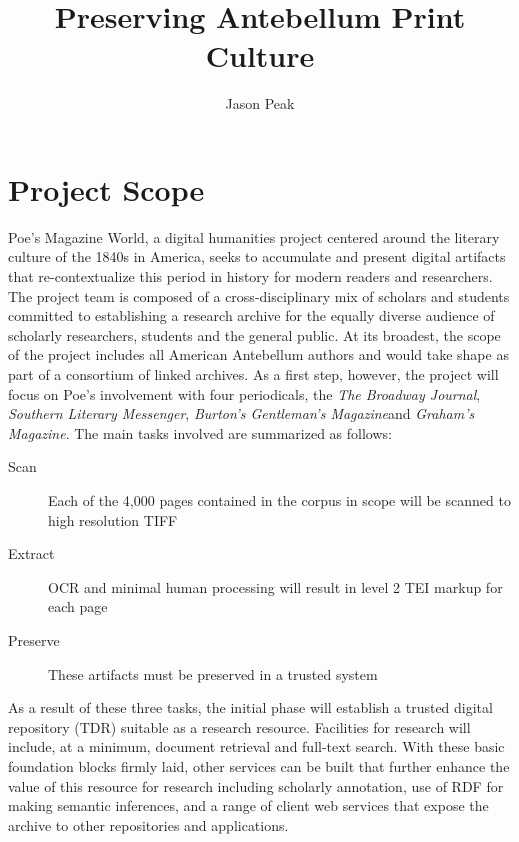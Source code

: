 \documentclass{article}
\begin{document}
\title{Preserving Antebellum Print Culture}
\author{Jason Peak}
\maketitle


\def\projectname{Poe's Magazine World}
\def\APC{Antebellum Print Culture}
\def\bwj{\emph{The Broadway Journal}}
\def\slm{\emph{Southern Literary Messenger}}
\def\bgm{\emph{Burton's Gentleman's Magazine}}
\def\gm{\emph{Graham's Magazine}}

\section{Project Scope}
\projectname, a digital humanities project centered around the literary culture of the 1840s in America, seeks to accumulate and present digital artifacts that re-contextualize this period in history for modern readers and researchers. The project team is composed of a cross-disciplinary mix of scholars and students committed to establishing a research archive for the equally diverse audience of scholarly researchers, students and the general public. At its broadest, the scope of the project includes all American Antebellum authors and would take shape as part of a consortium of linked archives. As a first step, however, the project will focus on Poe's involvement with four periodicals, the \bwj, \slm, \bgm and \gm. The main tasks involved are summarized as follows:

\begin{description}
  \item[Scan]{Each of the 4,000 pages contained in the corpus in scope will be scanned to high resolution TIFF}
  \item[Extract]{OCR and minimal human processing will result in level 2 TEI\cite{bpgtei} markup for each page}
  \item[Preserve]{These artifacts must be preserved in a trusted system}
\end{description}

As a result of these three tasks, the initial phase will establish a trusted digital repository (TDR) suitable as a research resource. Facilities for research will include, at a minimum, document retrieval and full-text search. With these basic foundation blocks firmly laid, other services can be built that further enhance the value of this resource for research including scholarly annotation, use of RDF for making semantic inferences, and a range of client web services that expose the archive to other repositories and applications.
\end{document}
